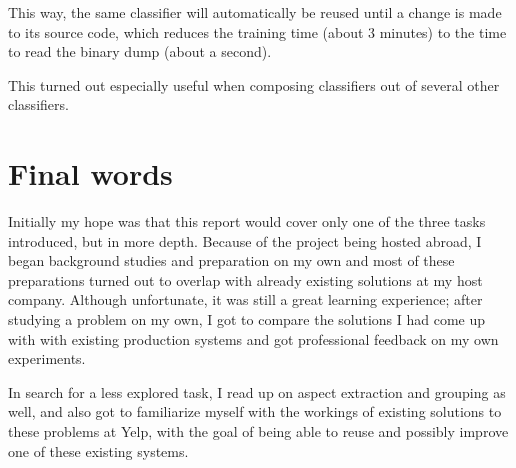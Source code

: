\documentclass[a4paper,11pt]{kth-mag}
\begin{document}
This way, the same classifier will automatically be reused until a change is made to 
its source code, which reduces the training time (about 3 minutes) to the time to
read the binary dump (about a second).

This turned out especially useful when composing classifiers out of several other classifiers.







\newpage

\section{Final words}
Initially my hope was that this report would cover only one of the three tasks introduced, but in more depth. Because of the project being hosted abroad, I began background studies and preparation on my own and most of these preparations turned out to overlap with already existing solutions at my host company. Although unfortunate, it was still a great learning experience; after studying a problem on my own, I got to compare the solutions I had come up with with existing production systems and got professional feedback on my own experiments.

In search for a less explored task, I read up on aspect extraction and grouping as well, and also got to familiarize myself with the workings of existing solutions to these problems at Yelp, with the goal of being able to reuse and possibly improve one of these existing systems.
\end{document}
